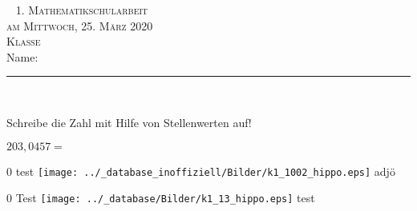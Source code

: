 \documentclass[a4paper,12pt]{report}
\begin{document}
\begin{titlepage}
\flushright
~\vfil 
\textsc{\Huge 1. Mathematikschularbeit} \\ 
[2cm] 
\textsc{\Large am Mittwoch, 25. März 2020}\\ [1cm] 
\textsc{\Large Klasse } \\ [1cm] 
\Large Name: \rule{8cm}{0.4pt} \\ 
\vfil\vfil\vfil 
\end{titlepage}

\begin{beispiel}{0}
				Schreibe die Zahl mit Hilfe von Stellenwerten auf!\leer
					
					$203,0457=$ 

\end{beispiel}

\begin{langesbeispiel} \item[0]
test \texttt{[image: ../\_database\_inoffiziell/Bilder/k1\_1002\_hippo.eps]} adjö

\end{langesbeispiel}

\begin{langesbeispiel} \item[0]
Test \texttt{[image: ../\_database/Bilder/k1\_13\_hippo.eps]} test

\end{langesbeispiel}



\end{document}
